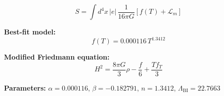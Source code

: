 
\begin{equation}
  S = \int d^4x \, |e| \, \frac{1}{16\pi G} \left[ f(T) + \mathcal{L}_m \right]
\end{equation}

\textbf{Best-fit model:}
\begin{equation}
  f(T) = 0.000116 \, T^{1.3412}
\end{equation}

\textbf{Modified Friedmann equation:}
\begin{equation}
  H^2 = \frac{8\pi G}{3} \rho - \frac{f}{6} + \frac{T f_T}{3}
\end{equation}

\textbf{Parameters:}
$\alpha = 0.000116$, \quad
$\beta = -0.182791$, \quad
$n = 1.3412$, \quad
$\Lambda_{\text{BI}} = 22.7663$
